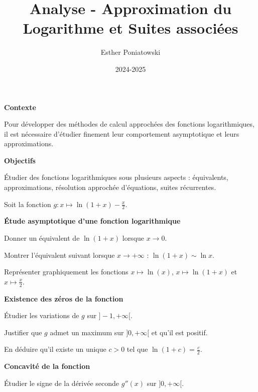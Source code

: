 \documentclass[10pt,a4paper]{article}
\title{Analyse - Approximation du Logarithme et Suites associées}
\author{Esther Poniatowski}
\date{2024-2025}
\begin{document}
\textbf{Contexte}

Pour développer des méthodes de calcul approchées des fonctions logarithmiques, il est nécessaire
d'étudier finement leur comportement asymptotique et leurs approximations.

\bigskip
\textbf{Objectifs}

Étudier des fonctions logarithmiques sous plusieurs aspects : équivalents, approximations,
résolution approchée d'équations, suites récurrentes.

Soit la fonction \( g : x \mapsto \ln(1+x) - \frac{x}{2} \).

\vspace{0.5cm}
\textbf{Étude asymptotique d'une fonction logarithmique}

\q Donner un équivalent de  \( \ln(1+x) \) lorsque \( x \to 0 \).

\q Montrer l'équivalent suivant lorsque \( x \to +\infty \) : \( \ln(1+x) \sim \ln x \).

\q Représenter graphiquement les fonctions \( x \mapsto \ln(x) \), \( x \mapsto \ln(1+x) \) et \( x
\mapsto \frac{x}{2} \).

\vspace{0.5cm}

\textbf{Existence des zéros de la fonction}

\q Étudier les variations de \( g \) sur \( ]-1, +\infty[ \).

\q Justifier que \( g \) admet un maximum sur \( ]0, +\infty[ \) et qu'il est positif.

\q En déduire qu'il existe un unique \( c > 0 \) tel que \( \ln(1+c) = \frac{c}{2} \).

\vspace{0.5cm}
\textbf{Concavité de la fonction}

\q Étudier le signe de la dérivée seconde \( g''(x) \) sur \( ]0, +\infty[ \).
\end{document}
